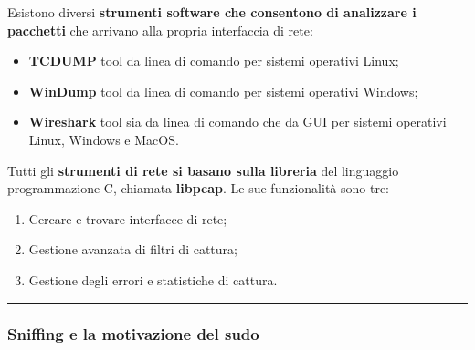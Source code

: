 \documentclass[a4paper]{article}
\newcommand{\longline}{\noindent\rule{\textwidth}{0.4pt}}
\begin{document}
	Esistono diversi \textbf{strumenti software che consentono di analizzare i pacchetti} che arrivano alla propria interfaccia di rete:
	\begin{itemize}
		\item \textbf{TCDUMP} tool da linea di comando per sistemi operativi Linux;
		
		\item \textbf{WinDump} tool da linea di comando per sistemi operativi Windows;
		
		\item \textbf{Wireshark} tool sia da linea di comando che da GUI per sistemi operativi Linux, Windows e MacOS.
	\end{itemize}
	Tutti gli \textbf{strumenti di rete si basano sulla libreria} del linguaggio programmazione C, chiamata \textcolor{Red3}{\textbf{\textsf{libpcap}}}. Le sue funzionalità sono tre:
	\begin{enumerate}
		\item Cercare e trovare interfacce di rete;
		
		\item Gestione avanzata di filtri di cattura;
		
		\item Gestione degli errori e statistiche di cattura.
	\end{enumerate}
	
	\longline
	
	\subsubsection{Sniffing e la motivazione del \textsf{sudo}}\label{sniffing e la motivazione del sudo}
	
\end{document}

